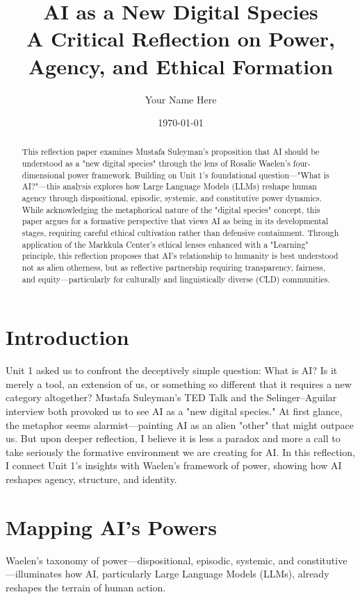 \documentclass[11pt,twoside]{article}
\title{\vspace{-0.5in}\textbf{\Large AI as a New Digital Species}\\[0.2em]
\large A Critical Reflection on Power, Agency, and Ethical Formation}
\author{Your Name Here}
\affil{IDAI700: Ethics of Artificial Intelligence\\
Rochester Institute of Technology\\
\texttt{email@rit.edu}}
\date{\today}
\begin{document}
\maketitle
\thispagestyle{fancy}

\begin{abstract}
\noindent This reflection paper examines Mustafa Suleyman's proposition that AI should be understood as a "new digital species" through the lens of Rosalie Waelen's four-dimensional power framework. Building on Unit 1's foundational question—"What is AI?"—this analysis explores how Large Language Models (LLMs) reshape human agency through dispositional, episodic, systemic, and constitutive power dynamics. While acknowledging the metaphorical nature of the "digital species" concept, this paper argues for a formative perspective that views AI as being in its developmental stages, requiring careful ethical cultivation rather than defensive containment. Through application of the Markkula Center's ethical lenses enhanced with a "Learning" principle, this reflection proposes that AI's relationship to humanity is best understood not as alien otherness, but as reflective partnership requiring transparency, fairness, and equity—particularly for culturally and linguistically diverse (CLD) communities.
\end{abstract}

\section{Introduction}

Unit 1 asked us to confront the deceptively simple question: What is AI? Is it merely a tool, an extension of us, or something so different that it requires a new category altogether? Mustafa Suleyman's TED Talk and the Selinger–Aguilar interview both provoked us to see AI as a "new digital species." At first glance, the metaphor seems alarmist—painting AI as an alien "other" that might outpace us. But upon deeper reflection, I believe it is less a paradox and more a call to take seriously the formative environment we are creating for AI. In this reflection, I connect Unit 1's insights with Waelen's framework of power, showing how AI reshapes agency, structure, and identity.

\section{Mapping AI's Powers}

Waelen's taxonomy of power—dispositional, episodic, systemic, and constitutive—illuminates how AI, particularly Large Language Models (LLMs), already reshapes the terrain of human action.
\end{document}
